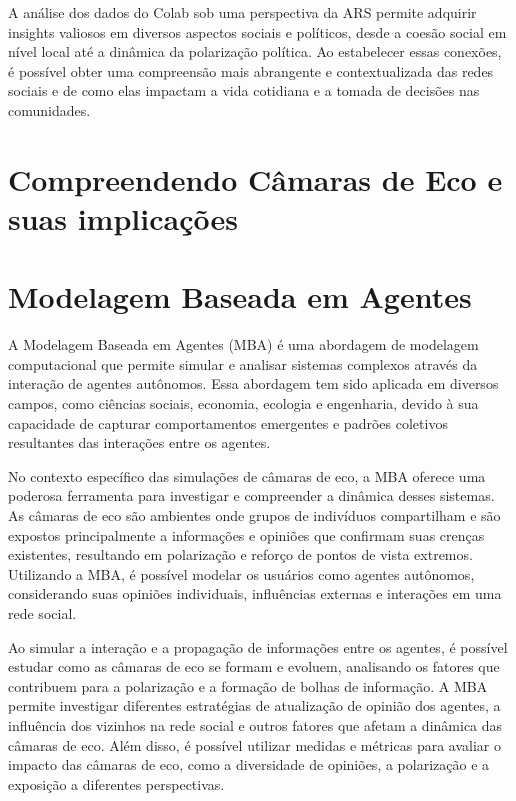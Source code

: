 A análise dos dados do Colab sob uma perspectiva da ARS permite adquirir insights valiosos em diversos aspectos sociais e políticos, desde a coesão social em nível local até a dinâmica da polarização política. Ao estabelecer essas conexões, é possível obter uma compreensão mais abrangente e contextualizada das redes sociais e de como elas impactam a vida cotidiana e a tomada de decisões nas comunidades.

\section{Compreendendo Câmaras de Eco e suas implicações}
\label{05_echochambers}


\section{Modelagem Baseada em Agentes}
\label{05_mba}
A Modelagem Baseada em Agentes (MBA) é uma abordagem de modelagem computacional que permite simular e analisar sistemas complexos através da interação de agentes autônomos. Essa abordagem tem sido aplicada em diversos campos, como ciências sociais, economia, ecologia e engenharia, devido à sua capacidade de capturar comportamentos emergentes e padrões coletivos resultantes das interações entre os agentes.

No contexto específico das simulações de câmaras de eco, a MBA oferece uma poderosa ferramenta para investigar e compreender a dinâmica desses sistemas. As câmaras de eco são ambientes onde grupos de indivíduos compartilham e são expostos principalmente a informações e opiniões que confirmam suas crenças existentes, resultando em polarização e reforço de pontos de vista extremos. Utilizando a MBA, é possível modelar os usuários como agentes autônomos, considerando suas opiniões individuais, influências externas e interações em uma rede social.

Ao simular a interação e a propagação de informações entre os agentes, é possível estudar como as câmaras de eco se formam e evoluem, analisando os fatores que contribuem para a polarização e a formação de bolhas de informação. A MBA permite investigar diferentes estratégias de atualização de opinião dos agentes, a influência dos vizinhos na rede social e outros fatores que afetam a dinâmica das câmaras de eco. Além disso, é possível utilizar medidas e métricas para avaliar o impacto das câmaras de eco, como a diversidade de opiniões, a polarização e a exposição a diferentes perspectivas.

